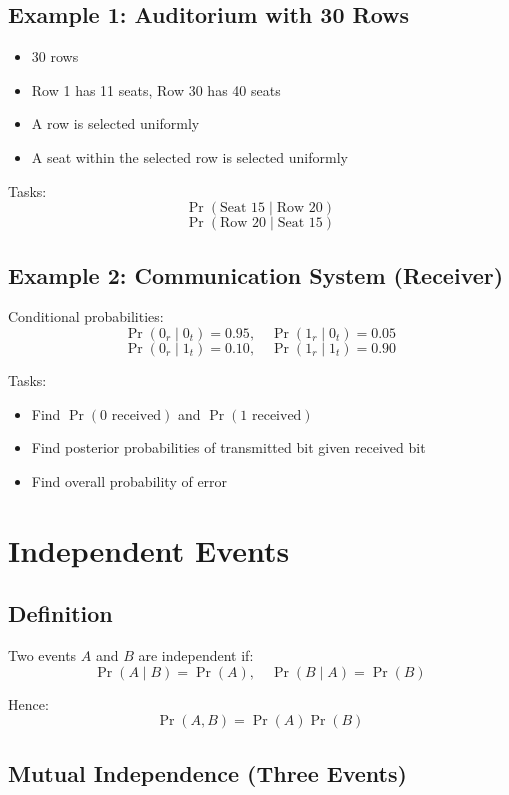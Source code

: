 \documentclass[11pt]{article}
\begin{document}
\subsection{Example 1: Auditorium with 30 Rows}

\begin{itemize}
    \item 30 rows
    \item Row 1 has 11 seats, Row 30 has 40 seats
    \item A row is selected uniformly
    \item A seat within the selected row is selected uniformly
\end{itemize}

Tasks:
\[
\Pr(\text{Seat 15} \mid \text{Row 20})
\]
\[
\Pr(\text{Row 20} \mid \text{Seat 15})
\]

\subsection{Example 2: Communication System (Receiver)}

Conditional probabilities:
\[
\Pr(0_r \mid 0_t) = 0.95, \quad \Pr(1_r \mid 0_t) = 0.05
\]
\[
\Pr(0_r \mid 1_t) = 0.10, \quad \Pr(1_r \mid 1_t) = 0.90
\]

Tasks:
\begin{itemize}
    \item Find $\Pr(0 \text{ received})$ and $\Pr(1 \text{ received})$
    \item Find posterior probabilities of transmitted bit given received bit
    \item Find overall probability of error
\end{itemize}

\section{Independent Events}

\subsection{Definition}

Two events $A$ and $B$ are independent if:
\[
\Pr(A \mid B) = \Pr(A), \quad \Pr(B \mid A) = \Pr(B)
\]

Hence:
\[
\Pr(A,B) = \Pr(A)\Pr(B)
\]

\subsection{Mutual Independence (Three Events)}
\end{document}
